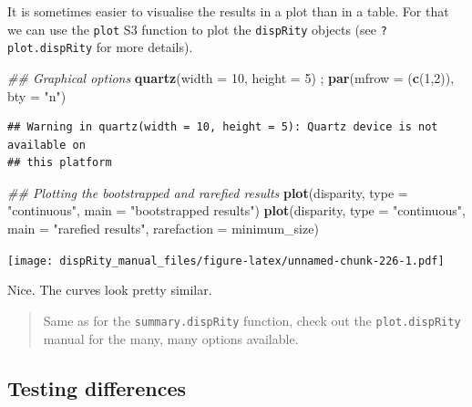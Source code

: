 \documentclass[
]{book}
\newenvironment{Shaded}{\begin{snugshade}}{\end{snugshade}}
\newcommand{\CommentTok}[1]{\textcolor[rgb]{0.56,0.35,0.01}{\textit{#1}}}
\newcommand{\DataTypeTok}[1]{\textcolor[rgb]{0.13,0.29,0.53}{#1}}
\newcommand{\DecValTok}[1]{\textcolor[rgb]{0.00,0.00,0.81}{#1}}
\newcommand{\KeywordTok}[1]{\textcolor[rgb]{0.13,0.29,0.53}{\textbf{#1}}}
\newcommand{\NormalTok}[1]{#1}
\newcommand{\StringTok}[1]{\textcolor[rgb]{0.31,0.60,0.02}{#1}}
\begin{document}
It is sometimes easier to visualise the results in a plot than in a table.
For that we can use the \texttt{plot} S3 function to plot the \texttt{dispRity} objects (see \texttt{?plot.dispRity} for more details).

\begin{Shaded}
\begin{Highlighting}[]
\CommentTok{\#\# Graphical options}
\KeywordTok{quartz}\NormalTok{(}\DataTypeTok{width =} \DecValTok{10}\NormalTok{, }\DataTypeTok{height =} \DecValTok{5}\NormalTok{) ; }\KeywordTok{par}\NormalTok{(}\DataTypeTok{mfrow =}\NormalTok{ (}\KeywordTok{c}\NormalTok{(}\DecValTok{1}\NormalTok{,}\DecValTok{2}\NormalTok{)), }\DataTypeTok{bty =} \StringTok{"n"}\NormalTok{)}
\end{Highlighting}
\end{Shaded}

\begin{verbatim}
## Warning in quartz(width = 10, height = 5): Quartz device is not available on
## this platform
\end{verbatim}

\begin{Shaded}
\begin{Highlighting}[]
\CommentTok{\#\# Plotting the bootstrapped and rarefied results}
\KeywordTok{plot}\NormalTok{(disparity, }\DataTypeTok{type =} \StringTok{"continuous"}\NormalTok{, }\DataTypeTok{main =} \StringTok{"bootstrapped results"}\NormalTok{)}
\KeywordTok{plot}\NormalTok{(disparity, }\DataTypeTok{type =} \StringTok{"continuous"}\NormalTok{, }\DataTypeTok{main =} \StringTok{"rarefied results"}\NormalTok{,}
     \DataTypeTok{rarefaction =}\NormalTok{ minimum\_size)}
\end{Highlighting}
\end{Shaded}

\texttt{[image: dispRity\_manual\_files/figure-latex/unnamed-chunk-226-1.pdf]}

Nice. The curves look pretty similar.

\begin{quote}
Same as for the \texttt{summary.dispRity} function, check out the \texttt{plot.dispRity} manual for the many, many options available.
\end{quote}

\hypertarget{testing-differences}{%
\subsection{Testing differences}\label{testing-differences}}
\end{document}
